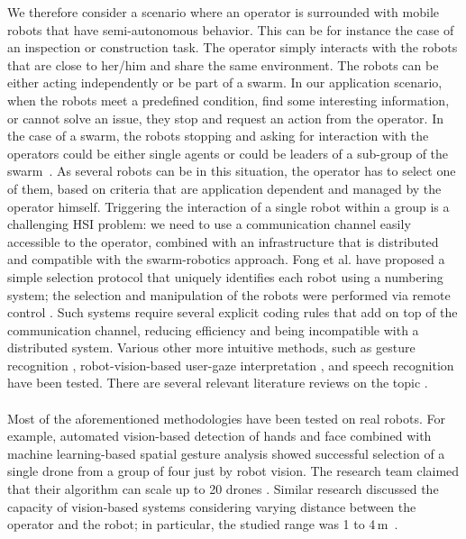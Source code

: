\documentclass[smallextended]{svjour3}
\begin{document}
We therefore consider a scenario where an operator is surrounded with mobile robots that have semi-autonomous behavior. This can be for instance the case of an inspection or construction task. 
The operator simply interacts with the robots that are close to her/him and share the same environment. The robots can be either acting independently or be part of a swarm. 
In our application scenario, when the robots meet a predefined condition, find some interesting information, or cannot solve an issue, they stop and request an action from the operator. In the case of a swarm, the robots stopping and asking for interaction with the operators could be either single agents or could be leaders of a sub-group of the swarm~\cite{Goodrich2012}. As several robots can be in this situation, the operator has to select one of them, based on criteria that are application dependent and managed by the operator himself. Triggering the interaction of a single robot within a group is a challenging HSI problem: we need to use a communication channel easily accessible to the operator, combined with an infrastructure that is distributed and compatible with the swarm-robotics approach.
Fong et al. have proposed a simple selection protocol that uniquely identifies each robot using a numbering system; the selection and manipulation of the robots were performed via remote control \cite{fong2003}. 
Such systems require several explicit coding rules that add on top of the communication channel, reducing efficiency and being incompatible with a distributed system. 
Various other more intuitive methods, such as gesture recognition \cite{Couture-Beil2010,Jones2010,Monajjemi2013,Nagietal2014}, robot-vision-based user-gaze interpretation \cite{Couture-Beil2010,Monajjemi2013,Pourmehr2013}, and speech recognition \cite{Pourmehr2013} have been tested. 
There are several relevant literature reviews on the topic \cite{goodrich2007human,Kolling2016,yanco2004classifying}.\\
\\
Most of the aforementioned methodologies have been tested on real robots. 
For example, automated vision-based detection of hands and face combined with machine learning-based spatial gesture analysis showed successful selection of a single drone from a group of four just by robot vision. 
The research team claimed that their algorithm can scale up to 20 drones \cite{Nagietal2014}. Similar research discussed the capacity of vision-based systems considering varying distance between the operator and the robot; in particular, the studied range was 1 to 4\,m~\cite{Couture-Beil2010}. 
\end{document}
